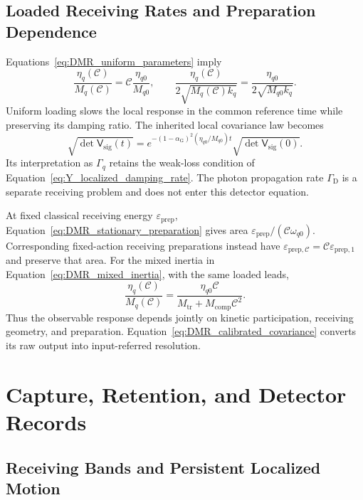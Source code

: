 \subsection{Loaded Receiving Rates and Preparation Dependence}

Equations~\eqref{eq:DMR_uniform_parameters} imply
\begin{equation}
 \frac{\eta_q(\mathcal C)}{M_q(\mathcal C)}=\mathcal C\frac{\eta_{q0}}{M_{q0}},
 \qquad
 \frac{\eta_q(\mathcal C)}{2\sqrt{M_q(\mathcal C)k_q}}
 =\frac{\eta_{q0}}{2\sqrt{M_{q0}k_q}}.
\label{eq:DMR_loaded_rate}
\end{equation}
Uniform loading slows the local response in the common reference time while preserving its damping ratio. The inherited local covariance law becomes
\begin{equation}
 \boxed{
 \sqrt{\det\mathsf V_{\mathrm{sig}}(t)}
 =e^{-(1-\alpha_{\mathrm G})^2(\eta_{q0}/M_{q0})t}
 \sqrt{\det\mathsf V_{\mathrm{sig}}(0)}
 }.
\label{eq:DMR_loaded_area_law}
\end{equation}
Its interpretation as $\Gamma_q$ retains the weak-loss condition of Equation~\eqref{eq:Y_localized_damping_rate}. The photon propagation rate $\Gamma_{\mathrm D}$ is a separate receiving problem and does not enter this detector equation.

At fixed classical receiving energy $\varepsilon_{\mathrm{prep}}$, Equation~\eqref{eq:DMR_stationary_preparation} gives area $\varepsilon_{\mathrm{prep}}/(\mathcal C\omega_{q0})$. Corresponding fixed-action receiving preparations instead have $\varepsilon_{\mathrm{prep},\mathcal C}=\mathcal C\varepsilon_{\mathrm{prep},1}$ and preserve that area. For the mixed inertia in Equation~\eqref{eq:DMR_mixed_inertia}, with the same loaded leads,
\begin{equation}
 \frac{\eta_q(\mathcal C)}{M_q(\mathcal C)}=
 \frac{\eta_{q0}\mathcal C}{M_{\mathrm{tr}}+M_{\mathrm{comp}}\mathcal C^2}.
\label{eq:DMR_mixed_rate}
\end{equation}
Thus the observable response depends jointly on kinetic participation, receiving geometry, and preparation. Equation~\eqref{eq:DMR_calibrated_covariance} converts its raw output into input-referred resolution.

\section{Capture, Retention, and Detector Records}
\label{sec:DMR_capture_records}

\subsection{Receiving Bands and Persistent Localized Motion}
\label{sec:DMR_receiving_band}

